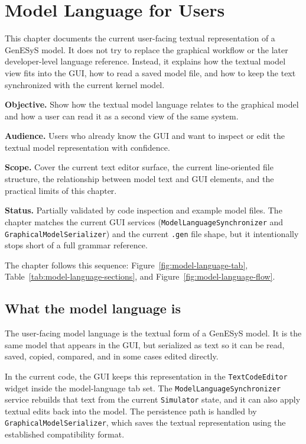 \chapter{Model Language for Users}
\label{chap:model-language-for-users}

This chapter documents the current user-facing textual representation of a
GenESyS model. It does not try to replace the graphical workflow or the later
developer-level language reference. Instead, it explains how the textual model
view fits into the GUI, how to read a saved model file, and how to keep the
text synchronized with the current kernel model.

\noindent\textbf{Objective.} Show how the textual model language relates to the
graphical model and how a user can read it as a second view of the same system.

\noindent\textbf{Audience.} Users who already know the GUI and want to inspect
or edit the textual model representation with confidence.

\noindent\textbf{Scope.} Cover the current text editor surface, the current
line-oriented file structure, the relationship between model text and GUI
elements, and the practical limits of this chapter.

\noindent\textbf{Status.} Partially validated by code inspection and example
model files. The chapter matches the current GUI services
(\texttt{ModelLanguageSynchronizer} and \texttt{GraphicalModelSerializer}) and
the current \texttt{.gen} file shape, but it intentionally stops short of a
full grammar reference.

The chapter follows this sequence:
Figure~\ref{fig:model-language-tab},
Table~\ref{tab:model-language-sections}, and
Figure~\ref{fig:model-language-flow}.

\section{What the model language is}
\label{sec:model-language-what-it-is}

The user-facing model language is the textual form of a GenESyS model. It is
the same model that appears in the GUI, but serialized as text so it can be
read, saved, copied, compared, and in some cases edited directly.

In the current code, the GUI keeps this representation in the
\texttt{TextCodeEditor} widget inside the model-language tab set. The
\texttt{ModelLanguageSynchronizer} service rebuilds that text from the current
\texttt{Simulator} state, and it can also apply textual edits back into the
model. The persistence path is handled by
\texttt{GraphicalModelSerializer}, which saves the textual representation using
the established compatibility format.

